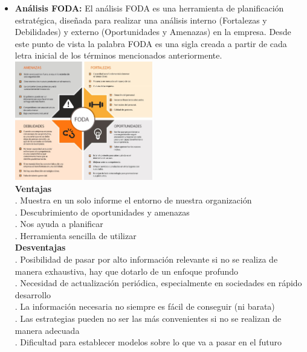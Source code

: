 \documentclass[%
 reprint,
 amsmath,amssymb,
 aps,
]{revtex4-1}
\begin{document}
\begin{itemize}
\item \textbf{ Análisis FODA: }
El análisis FODA es una herramienta de planificación estratégica, diseñada para realizar una análisis interno (Fortalezas y Debilidades) y externo (Oportunidades y Amenazas) en la empresa. Desde este punto de vista la palabra FODA es una sigla creada a partir de cada letra inicial de los términos mencionados anteriormente.
\includegraphics[width=6cm]{./Imagenes/img2}\\
\textbf{ Ventajas}\\
. Muestra en un solo informe el entorno de nuestra organización\\
. Descubrimiento de oportunidades y amenazas\\
. Nos ayuda a planificar\\
. Herramienta sencilla de utilizar\\
\textbf{ Desventajas}\\
. Posibilidad de pasar por alto información relevante si no se realiza de manera exhaustiva, hay que dotarlo de un enfoque profundo\\
. Necesidad de actualización periódica, especialmente en sociedades en rápido desarrollo\\
. La información necesaria no siempre es fácil de conseguir (ni barata)\\
. Las estrategias pueden no ser las más convenientes si no se realizan de manera adecuada\\
. Dificultad para establecer modelos sobre lo que va a pasar en el futuro\\


\end{itemize}
\end{document}
